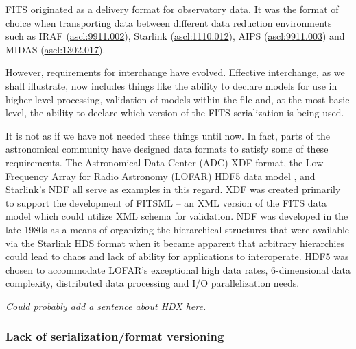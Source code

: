 \documentclass[final,authoryear,5p,times,twocolumn]{elsarticle}
\begin{document}
FITS originated as a delivery format for observatory data. It was the format
of choice when transporting data between different data reduction
environments such as IRAF (\href{http://ascl.net/9911.002}{ascl:9911.002}),
Starlink (\href{http://ascl.net/1110.012}{ascl:1110.012}), AIPS
(\href{http://ascl.net/9911.003}{ascl:9911.003}) and MIDAS
(\href{http://ascl.net/1302.017}{ascl:1302.017}).


However, requirements for interchange have evolved. Effective
interchange, as we shall illustrate, now includes things like the
ability to declare models for use in higher level processing,
validation of models within the file and, at the most basic level, the
ability to declare which version of the FITS serialization is being
used.


It is not as if we have not needed these things until now. In fact,
parts of the astronomical community have designed data formats to
satisfy some of these requirements. The Astronomical Data Center (ADC) XDF
format, the Low-Frequency Array for Radio Astronomy (LOFAR) HDF5 data
model \citep{2012ASPC..461..283A}, and Starlink's NDF
\citep{1988STARB...2...11C,1993ASPC...52..229W,P91_adassxxiii} all
serve as examples in this regard. XDF was created primarily to support
the development of FITSML -- an XML version of the FITS data model which
could utilize XML schema for validation. NDF was developed in the late
1980s as a means of organizing the hierarchical structures that were
available via the Starlink HDS format when it became apparent that
arbitrary hierarchies could lead to chaos and lack of ability for
applications to interoperate.  HDF5 was chosen to accommodate LOFAR's
exceptional high data rates, 6-dimensional data complexity, distributed
data processing and I/O parallelization needs.

\textit{\color{red} Could probably add a sentence about HDX here.}

\subsubsection{Lack of serialization/format versioning}
\end{document}
